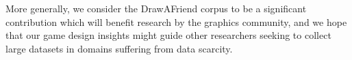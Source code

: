 More generally, we consider the DrawAFriend corpus to be a
significant contribution which will benefit research by the graphics
community, and we hope that our game design insights might guide
other researchers seeking to collect large datasets in domains
suffering from data scarcity.


% 	
% 
% 
% 

